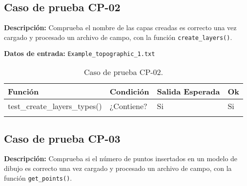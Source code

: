 \subsection{Caso de prueba CP-02}

\textbf{Descripción:} Comprueba el nombre de las capas creadas es correcto una vez cargado y procesado un archivo de campo, con la función \texttt{create\_layers()}.

\textbf{Datos de entrada:} \texttt{Example\_topographic\_1.txt}


\begin{longtable}[]{@{}llll@{}}
\toprule
\begin{minipage}[b]{0.6\columnwidth}\raggedright\strut
Función\strut
\end{minipage} & \begin{minipage}[b]{0.20\columnwidth}\raggedright\strut
Condición\strut
\end{minipage} & \begin{minipage}[b]{0.15\columnwidth}\raggedright\strut
Salida Esperada\strut
\end{minipage} & \begin{minipage}[b]{0.05\columnwidth}\raggedright\strut
Ok\strut
\end{minipage}\tabularnewline
\midrule
\endhead
\begin{minipage}[t]{0.6\columnwidth}\raggedright\strut
test\_create\_layers\_types()\strut
\end{minipage} & \begin{minipage}[t]{0.20\columnwidth}\raggedright\strut
¿Contiene?\strut
\end{minipage} & \begin{minipage}[t]{0.15\columnwidth}\raggedright\strut
Si\strut
\end{minipage} & \begin{minipage}[t]{0.05\columnwidth}\raggedright\strut
Si\strut
\end{minipage}\tabularnewline
\bottomrule
\caption{Caso de prueba CP-02.}
\end{longtable}

\subsection{Caso de prueba CP-03}

\textbf{Descripción:} Comprueba si el número de puntos insertados en un modelo de dibujo es correcto una vez cargado y procesado un archivo de campo, con la función \texttt{get\_points()}.

